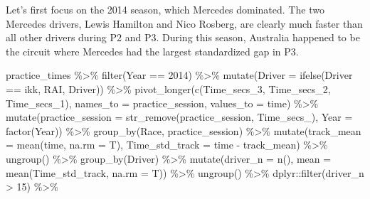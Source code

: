 \documentclass[
]{book}
\newenvironment{Shaded}{\begin{snugshade}}{\end{snugshade}}
\newcommand{\AttributeTok}[1]{\textcolor[rgb]{0.77,0.63,0.00}{#1}}
\newcommand{\DecValTok}[1]{\textcolor[rgb]{0.00,0.00,0.81}{#1}}
\newcommand{\FunctionTok}[1]{\textcolor[rgb]{0.00,0.00,0.00}{#1}}
\newcommand{\NormalTok}[1]{#1}
\newcommand{\SpecialCharTok}[1]{\textcolor[rgb]{0.00,0.00,0.00}{#1}}
\newcommand{\StringTok}[1]{\textcolor[rgb]{0.31,0.60,0.02}{#1}}
\begin{document}
Let's first focus on the 2014 season, which Mercedes dominated. The two Mercedes drivers, Lewis Hamilton and Nico Rosberg, are clearly much faster than all other drivers during P2 and P3. During this season, Australia happened to be the circuit where Mercedes had the largest standardized gap in P3.

\begin{Shaded}
\begin{Highlighting}[]
\NormalTok{practice\_times }\SpecialCharTok{\%\textgreater{}\%}
  \FunctionTok{filter}\NormalTok{(Year }\SpecialCharTok{==} \DecValTok{2014}\NormalTok{) }\SpecialCharTok{\%\textgreater{}\%} 
  \FunctionTok{mutate}\NormalTok{(}\AttributeTok{Driver =} \FunctionTok{ifelse}\NormalTok{(Driver }\SpecialCharTok{==} \StringTok{\textquotesingle{}ikk\textquotesingle{}}\NormalTok{, }\StringTok{\textquotesingle{}RAI\textquotesingle{}}\NormalTok{, Driver)) }\SpecialCharTok{\%\textgreater{}\%} 
  \FunctionTok{pivot\_longer}\NormalTok{(}\FunctionTok{c}\NormalTok{(Time\_secs\_3, Time\_secs\_2, Time\_secs\_1), }\AttributeTok{names\_to =} \StringTok{\textquotesingle{}practice\_session\textquotesingle{}}\NormalTok{, }\AttributeTok{values\_to =} \StringTok{\textquotesingle{}time\textquotesingle{}}\NormalTok{) }\SpecialCharTok{\%\textgreater{}\%}
  \FunctionTok{mutate}\NormalTok{(}\AttributeTok{practice\_session =} \FunctionTok{str\_remove}\NormalTok{(practice\_session, }\StringTok{\textquotesingle{}Time\_secs\_\textquotesingle{}}\NormalTok{),}
         \AttributeTok{Year =} \FunctionTok{factor}\NormalTok{(Year)) }\SpecialCharTok{\%\textgreater{}\%}
   \FunctionTok{group\_by}\NormalTok{(Race, practice\_session) }\SpecialCharTok{\%\textgreater{}\%}
   \FunctionTok{mutate}\NormalTok{(}\AttributeTok{track\_mean =} \FunctionTok{mean}\NormalTok{(time, }\AttributeTok{na.rm =}\NormalTok{ T),}
          \AttributeTok{Time\_std\_track =}\NormalTok{ time }\SpecialCharTok{{-}}\NormalTok{ track\_mean) }\SpecialCharTok{\%\textgreater{}\%} 
   \FunctionTok{ungroup}\NormalTok{() }\SpecialCharTok{\%\textgreater{}\%} 
   \FunctionTok{group\_by}\NormalTok{(Driver) }\SpecialCharTok{\%\textgreater{}\%} 
   \FunctionTok{mutate}\NormalTok{(}\AttributeTok{driver\_n =} \FunctionTok{n}\NormalTok{(),}
          \AttributeTok{mean =} \FunctionTok{mean}\NormalTok{(Time\_std\_track, }\AttributeTok{na.rm =}\NormalTok{ T)) }\SpecialCharTok{\%\textgreater{}\%}
   \FunctionTok{ungroup}\NormalTok{() }\SpecialCharTok{\%\textgreater{}\%}
\NormalTok{   dplyr}\SpecialCharTok{::}\FunctionTok{filter}\NormalTok{(driver\_n }\SpecialCharTok{\textgreater{}} \DecValTok{15}\NormalTok{) }\SpecialCharTok{\%\textgreater{}\%} 

\end{Highlighting}
\end{Shaded}
\end{document}
